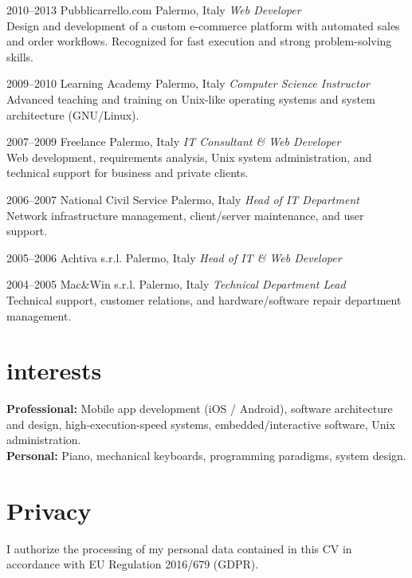 \documentclass[]{friggeri-cv} %
\begin{document}
\begin{entrylist}
\entry
{2010--2013}
{Pubblicarrello.com}
{Palermo, Italy}
{\emph{Web Developer} \\
Design and development of a custom e-commerce platform with automated sales and order workflows. Recognized for fast execution and strong problem-solving skills.
}

\entry
{2009--2010}
{Learning Academy}
{Palermo, Italy}
{\emph{Computer Science Instructor} \\
Advanced teaching and training on Unix-like operating systems and system architecture (GNU/Linux).
}

\entry
{2007--2009}
{Freelance}
{Palermo, Italy}
{\emph{IT Consultant \& Web Developer} \\
Web development, requirements analysis, Unix system administration, and technical support for business and private clients.
}

\entry
{2006--2007}
{National Civil Service}
{Palermo, Italy}
{\emph{Head of IT Department} \\
Network infrastructure management, client/server maintenance, and user support.
}

\entry
{2005--2006}
{Achtiva s.r.l.}
{Palermo, Italy}
{\emph{Head of IT \& Web Developer} }

\entry
{2004--2005}
{Mac\&Win s.r.l.}
{Palermo, Italy}
{\emph{Technical Department Lead} \\
Technical support, customer relations, and hardware/software repair department management.
}

\end{entrylist}

\section{interests}
\textbf{Professional:} Mobile app development (iOS / Android), software architecture and design, high-execution-speed systems, embedded/interactive software, Unix administration. \\
\textbf{Personal:} Piano, mechanical keyboards, programming paradigms, system design.

\section{Privacy}
I authorize the processing of my personal data contained in this CV in accordance with EU Regulation 2016/679 (GDPR).
\end{document}
